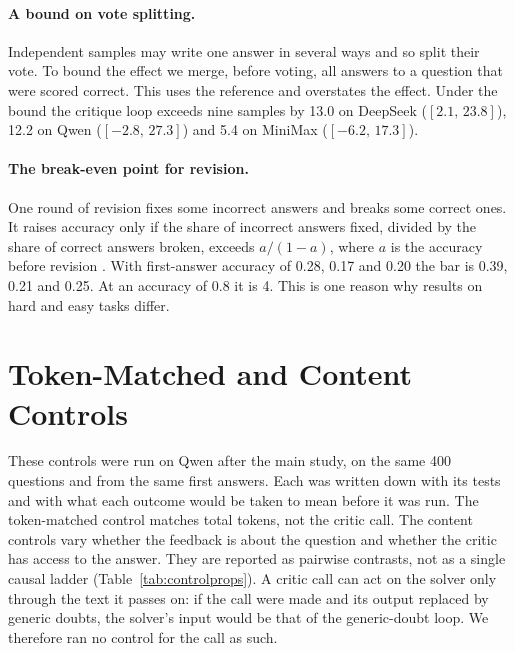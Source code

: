\documentclass[11pt]{article}
\newcommand{\ds}{DeepSeek}
\newcommand{\qw}{Qwen}
\newcommand{\mm}{MiniMax}
\newcommand{\ci}[2]{$[#1,\,#2]$}
\begin{document}
\paragraph{A bound on vote splitting.}
Independent samples may write one answer in several ways and so split their vote.
To bound the effect we merge, before voting, all answers to a question that were scored correct. This uses the reference and overstates the effect.
Under the bound the critique loop exceeds nine samples by 13.0 on \ds{} (\ci{2.1}{23.8}), 12.2 on \qw{} (\ci{-2.8}{27.3}) and 5.4 on \mm{} (\ci{-6.2}{17.3}).

\paragraph{The break-even point for revision.}
One round of revision fixes some incorrect answers and breaks some correct ones.
It raises accuracy only if the share of incorrect answers fixed, divided by the share of correct answers broken, exceeds $a/(1-a)$, where $a$ is the accuracy before revision \citep{yang2024confidence}.
With first-answer accuracy of 0.28, 0.17 and 0.20 the bar is 0.39, 0.21 and 0.25. At an accuracy of 0.8 it is 4.
This is one reason why results on hard and easy tasks differ.

\section{Token-Matched and Content Controls}
\label{app:controls}

These controls were run on \qw{} after the main study, on the same 400 questions and from the same first answers.
Each was written down with its tests and with what each outcome would be taken to mean before it was run.
The token-matched control matches total tokens, not the critic call.
The content controls vary whether the feedback is about the question and whether the critic has access to the answer. They are reported as pairwise contrasts, not as a single causal ladder (Table~\ref{tab:controlprops}).
A critic call can act on the solver only through the text it passes on: if the call were made and its output replaced by generic doubts, the solver's input would be that of the generic-doubt loop. We therefore ran no control for the call as such.
\end{document}
